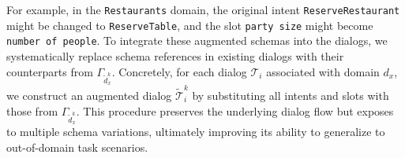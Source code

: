For example, in the \texttt{Restaurants} domain, the original intent \texttt{ReserveRestaurant} might be changed to \texttt{ReserveTable}, and the slot \texttt{party size} might become \texttt{number of people}.
To integrate these augmented schemas into the dialogs, we systematically replace schema references in existing dialogs with their counterparts from \(\Gamma_{\tilde{d}^k_x} \).
Concretely, for each dialog $\mathcal{T}_i$ associated with domain \(d_x\), we construct an augmented dialog $\tilde{\mathcal{T}}_i^k$ by substituting all intents and slots with those from \(\Gamma_{\tilde{d}^k_x} \). 
This procedure preserves the underlying dialog flow but exposes {\oursys} to multiple schema variations, ultimately improving its ability to generalize to out-of-domain task scenarios.


 







